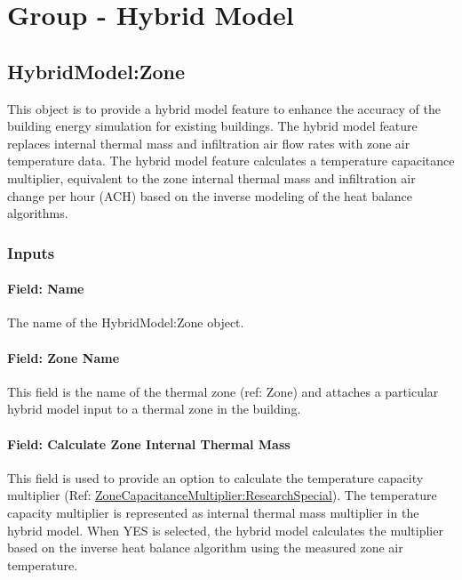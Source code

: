 \section{Group - Hybrid Model}\label{group---hybrid-model}

\subsection{HybridModel:Zone}\label{hybridmodel-zone}

This object is to provide a hybrid model feature to enhance the accuracy of the building energy simulation for existing buildings. The hybrid model feature replaces internal thermal mass and infiltration air flow rates with zone air temperature data. The hybrid model feature calculates a temperature capacitance multiplier, equivalent to the zone internal thermal mass and infiltration air change per hour (ACH) based on the inverse modeling of the heat balance algorithms.

\subsubsection{Inputs}\label{inputs-hm}

\paragraph{Field: Name}\label{field-name-hm}

The name of the HybridModel:Zone object.

\paragraph{Field: Zone Name}\label{field-zone-name-hm}

This field is the name of the thermal zone (ref: Zone) and attaches a particular hybrid model input to a thermal zone in the building.

\paragraph{Field: Calculate Zone Internal Thermal Mass}\label{field-calculate-zon-internal-thermal-mass-hm}

This field is used to provide an option to calculate the temperature capacity multiplier (Ref: \hyperref[zonecapacitancemultiplierresearchspecial]{ZoneCapacitanceMultiplier:ResearchSpecial}). The temperature capacity multiplier is represented as internal thermal mass multiplier in the hybrid model.
When YES is selected, the hybrid model calculates the multiplier based on the inverse heat balance algorithm using the measured zone air temperature.

